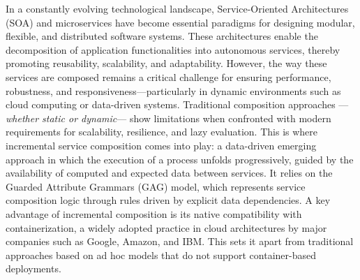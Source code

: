 \let\oldprintchaptertitle=\printchaptertitle
\renewcommand{\printchaptertitle}[1]{%
	\vspace*{-75pt}
	\oldprintchaptertitle{#1}
}%
\let\printchaptertitle=\oldprintchaptertitle

In a constantly evolving technological landscape, Service-Oriented Architectures (SOA) and microservices have become essential paradigms for designing modular, flexible, and distributed software systems. 
These architectures enable the decomposition of application functionalities into autonomous services, thereby promoting reusability, scalability, and adaptability. However, the way these services are composed remains a critical challenge for ensuring performance, robustness, and responsiveness—particularly in dynamic environments such as cloud computing or data-driven systems.
Traditional composition approaches —\textit{whether static or dynamic}— %
show limitations when confronted with modern requirements for scalability, resilience, and lazy evaluation.
This is where incremental service composition comes into play: a data-driven emerging approach in which the execution of a process unfolds progressively, guided by the availability of computed and expected data between services. It relies on the Guarded Attribute Grammars (GAG) model, which represents service composition logic through rules driven by explicit data dependencies. A key advantage of incremental composition is its native compatibility with containerization, a widely adopted practice in cloud architectures by major companies such as Google, Amazon, and IBM. This sets it apart from traditional approaches based on ad hoc models that do not support container-based deployments.
